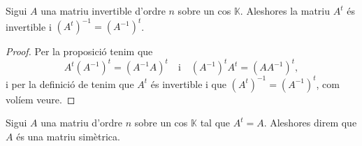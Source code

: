 \documentclass[../../Main.tex]{subfiles}
\begin{document}
	\begin{proposition}
		\label{prop:transposada d'una invertible és invertible}
		Sigui \(A\) una matriu invertible d'ordre \(n\) sobre un cos \(\mathbb{K}\). Aleshores la matriu \(A^{t}\) és invertible i \(\left(A^{t}\right)^{-1}=\left(A^{-1}\right)^{t}\).
		\begin{proof}
			Per la proposició  tenim que
			\[
			    A^{t}\left(A^{-1}\right)^{t}=\left(A^{-1}A\right)^{t}\quad\text{i}\quad \left(A^{-1}\right)^{t}A^{t}=\left(AA^{-1}\right)^{t},
			\]
			i per la definició de  tenim que \(A^{t}\) és invertible i que \(\left(A^{t}\right)^{-1}=\left(A^{-1}\right)^{t}\), com volíem veure.
		\end{proof}
	\end{proposition}
	\begin{definition}
		\label{def:matriu simètrica}
		Sigui \(A\) una matriu d'ordre \(n\) sobre un cos \(\mathbb{K}\) tal que \(A^{t}=A\). Aleshores direm que \(A\) és una matriu simètrica.
	\end{definition}
\end{document}
